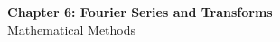 \documentclass[12pt]{article}
\begin{document}
\begin{center}
  {\LARGE\bfseries Chapter 6: Fourier Series and Transforms}\\[0.25em]
  {\large Mathematical Methods}\\[0.15em]
\end{center}

\end{document}
